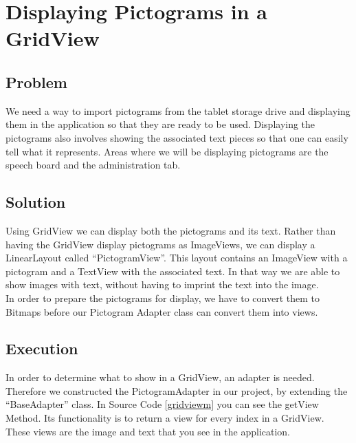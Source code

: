 \section{Displaying Pictograms in a GridView} %
\label{disppict}

\subsection*{Problem}
We need a way to import pictograms from the tablet storage drive and displaying them in the application so that they are ready to be used.
Displaying the pictograms also involves showing the associated text pieces so that one can easily tell what it represents.
Areas where we will be displaying pictograms are the speech board and the administration tab.

\subsection*{Solution}
Using GridView we can display both the pictograms and its text.
Rather than having the GridView display pictograms as ImageViews, we can display a LinearLayout called ``PictogramView''.
This layout contains an ImageView with a pictogram and a TextView with the associated text.
In that way we are able to show images with text, without having to imprint the text into the image.\\

In order to prepare the pictograms for display, we have to convert them to Bitmaps before our Pictogram Adapter class can convert them into views.

\subsection*{Execution}
In order to determine what to show in a GridView, an adapter is needed. Therefore we constructed the PictogramAdapter in our project, by extending the ``BaseAdapter'' class.
In Source Code \ref{gridviewm} you can see the getView Method. Its functionality is to return a view for every index in a GridView.
These views are the image and text that you see in the application.\\


